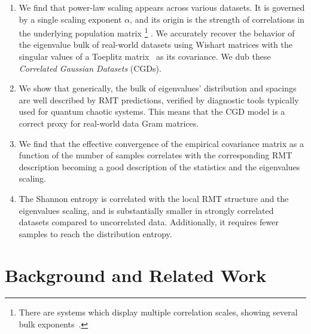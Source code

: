 \documentclass{article}
\begin{document}
\begin{enumerate}
    \item 
    We find that power-law scaling appears across various datasets. It is governed by a single scaling exponent $\alpha$, and its origin is the strength of correlations in the underlying population matrix    \footnote{There are systems which display multiple correlation scales, showing several bulk exponents~\citep{levi2023universal}.} .
    We accurately recover the behavior of the eigenvalue bulk of real-world datasets using Wishart matrices with the singular values of a Toeplitz matrix~\citep{CIT-006} as its covariance. We dub these {\it Correlated Gaussian Datasets} (CGDs).
    \item 
    We show that generically, the bulk of eigenvalues'
    distribution and spacings are well described by RMT predictions, verified by diagnostic tools typically used for quantum chaotic systems. This means that the CGD model is a correct proxy for real-world data Gram matrices. 
    \item 
    We find that the effective convergence of the empirical covariance matrix as a function of the number of samples correlates with the corresponding RMT description becoming a good description of the statistics and the eigenvalues scaling.
    \item 
    The Shannon entropy is correlated with the local RMT structure and the eigenvalues scaling, and is substantially smaller in strongly correlated datasets compared to uncorrelated data. Additionally, it requires fewer samples to reach the distribution entropy.
\end{enumerate}

\section{Background and Related Work}
\label{back}
\end{document}
